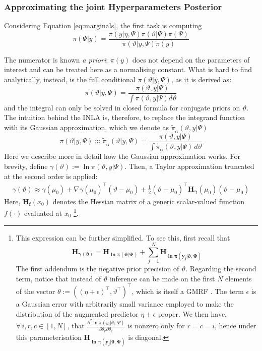 \documentclass[openany, 11pt, oneside]{book}
\begin{document}
\subsubsection{Approximating the joint Hyperparameters Posterior} \label{par:inla_psi}
Considering Equation \ref{eq:marginals}, the first task is computing
 $$
\pi(\Psi \vert y) =  \frac{\pi(y \vert \eta, \Psi) \pi(\vartheta \vert \Psi) \pi(\Psi)}
{\pi(\vartheta \vert y, \Psi)\pi(y)} 
 $$
 
 The numerator is known \textit{a priori}; $\pi(y)$ does not depend on the parameters of interest and can be treated here as a normalising constant. What is hard to find analytically, instead, is the full conditional $\pi(\vartheta \vert y, \Psi)$, as it is derived as:
 $$
 \pi(\vartheta \vert y, \Psi) = \frac{\pi(\vartheta, y \vert \Psi)}{\int \pi(\vartheta, y \vert \Psi) d \vartheta}
 $$
 and the integral can only be solved in closed formula for conjugate priors on $\vartheta$. The intuition behind the INLA is, therefore, to replace the integrand function with its Gaussian approximation, which we denote as $\tilde{\pi}_\mathrm{_G}(\vartheta, y \vert \Psi)$
%
\begin{equation}
\label{eq:GaussianApprox}
\pi(\vartheta \vert y, \Psi) \approx \tilde{\pi}_\mathrm{_G}(\vartheta \vert y, \Psi) = \frac{\pi(\vartheta, y \vert \Psi)}{\int \tilde{\pi}_\mathrm{_G}(\vartheta, y \vert \Psi) \, d\vartheta}
\end{equation}
%
Here we describe more in detail how the Gaussian approximation works. For brevity, define $\gamma(\vartheta) := \ln \pi(\vartheta, y \vert \Psi)$. Then, a Taylor approximation truncated at the second order is applied:
%
\begin{align*}
\gamma(\vartheta) \approx   \gamma(\mu_0) + \nabla   \gamma(\mu_0)^\top(\vartheta - \mu_0)+ \frac{1}{2}
(\vartheta - \mu_0)^\top \boldsymbol{H_\gamma}(\mu_0)(\vartheta - \mu_0)
\end{align*}
%
Here, $\boldsymbol{H_f}(x_0)$ denotes the Hessian matrix of a generic scalar-valued function $f(\cdot)$ evaluated at $x_0$ \footnote{This expression can be further simplified. To see this, first recall that $$\boldsymbol{H_{\gamma(\vartheta)}} = \boldsymbol{H_{ \ln \pi (\vartheta \vert \Psi)}}  + \sum_{j=1}^{N}\boldsymbol{ H_{\ln \pi(y_j \vert \vartheta, \Psi)}}$$ The first addendum is the negative prior precision of $\vartheta$. Regarding the second term, notice that instead of $\vartheta$ inference can be made on the first $N$ elements of the vector $\theta:= ((\eta + \epsilon)^{\top}, \vartheta^{\top})^{\top}$, which is itself a GMRF \parencite{INLA2017}. The term $\epsilon$ is a Gaussian error with arbitrarily small variance employed to make the distribution of the augmented predictor $\eta + \epsilon$ proper. We then have, $\forall\, i,r,c \in [1, N]$, that $\frac{\partial^2 \ln \pi(y_i \vert\theta_i, \Psi)}{\partial \theta_r \partial \theta_c}$ is nonzero only for $r = c = i$, hence under this parameterisation $\boldsymbol{ H_{\ln \pi(y_j \vert \vartheta, \Psi)}}$ is diagonal.}. 
\end{document}
